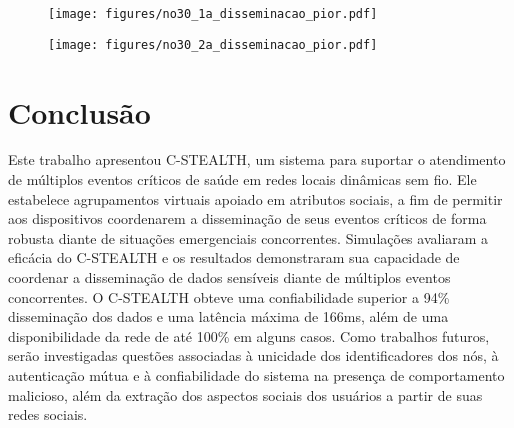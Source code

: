 \documentclass[12pt]{article}
\begin{document}
\vspace{-3.0pt}

\begin{figure}[H]
\centering
	\vspace{-3.0pt}
	\begin{minipage}[t]{0.32\linewidth}
		\texttt{[image: figures/no30\_1a\_disseminacao\_pior.pdf]}
	\end{minipage}
	\hspace{0.5cm}
	\begin{minipage}[t]{0.32\linewidth}
		\texttt{[image: figures/no30\_2a\_disseminacao\_pior.pdf]}
	\end{minipage}
	\label{fig:no30pior}
	\vspace{-0.7cm}
\end{figure}




\begin{comment}
\begin{table}[H]
\relsize{-1.0}
\centering
\caption{Latência na disseminação dos eventos}
\label{tab:latencia}
\begin{tabular}{l|cc|cc|cc}
\hlineB{2}
\textbf{Nó}      & \textbf{30} & \textbf{53} & \textbf{70} & \textbf{98} & \textbf{92} & \textbf{95} \\ \hline
\textbf{ADE} &  166ms  &  93ms  &  82ms  &  88ms &  56ms  &  54ms    \\ \hlineB{2}
\end{tabular}
\end{table}
\end{comment}

\section{Conclusão} 
\label{sec:conc}

Este trabalho apresentou \mbox{C-STEALTH}, um sistema para suportar o atendimento de múltiplos eventos críticos de saúde em redes locais dinâmicas sem fio. Ele estabelece agrupamentos virtuais apoiado em atributos sociais, a fim de permitir aos dispositivos coordenarem a disseminação de seus eventos críticos de forma robusta diante de situações emergenciais concorrentes. Simulações avaliaram a eficácia do \mbox{C-STEALTH} e os resultados demonstraram sua capacidade de coordenar a disseminação de dados sensíveis diante de múltiplos eventos concorrentes. O \mbox{C-STEALTH} obteve uma confiabilidade superior a 94\% disseminação dos dados e uma latência máxima de 166ms, além de uma disponibilidade da rede de até 100\% em alguns casos. Como trabalhos futuros, serão investigadas questões associadas à unicidade dos identificadores dos nós, à autenticação mútua e à confiabilidade do sistema na presença de comportamento malicioso, além da extração dos aspectos sociais dos usuários a partir de suas redes sociais.

\vspace{-5.0pt}
\small


\end{document}
